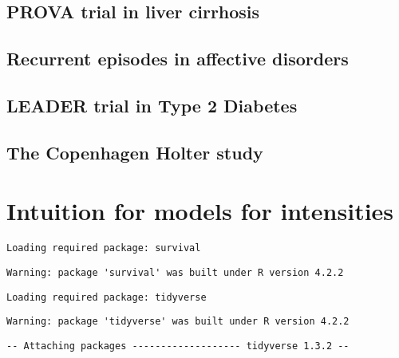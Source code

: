 \documentclass[
  letterpaper,
  DIV=11,
  numbers=noendperiod]{scrreprt}
\begin{document}
\hypertarget{prova-trial-in-liver-cirrhosis}{%
\section{PROVA trial in liver
cirrhosis}\label{prova-trial-in-liver-cirrhosis}}

\hypertarget{recurrent-episodes-in-affective-disorders}{%
\section{Recurrent episodes in affective
disorders}\label{recurrent-episodes-in-affective-disorders}}

\hypertarget{leader-trial-in-type-2-diabetes}{%
\section{LEADER trial in Type 2
Diabetes}\label{leader-trial-in-type-2-diabetes}}

\hypertarget{the-copenhagen-holter-study}{%
\section{The Copenhagen Holter
study}\label{the-copenhagen-holter-study}}


\hypertarget{intuition-for-models-for-intensities}{%
\chapter{Intuition for models for
intensities}\label{intuition-for-models-for-intensities}}

\begin{verbatim}
Loading required package: survival
\end{verbatim}

\begin{verbatim}
Warning: package 'survival' was built under R version 4.2.2
\end{verbatim}

\begin{verbatim}
Loading required package: tidyverse
\end{verbatim}

\begin{verbatim}
Warning: package 'tidyverse' was built under R version 4.2.2
\end{verbatim}

\begin{verbatim}
-- Attaching packages ------------------- tidyverse 1.3.2 --
\end{verbatim}
\end{document}
